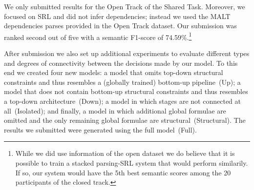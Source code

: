 We only submitted results for the Open Track of the Shared Task. Moreover, we focused on SRL and did not infer dependencies; instead we used the MALT dependencies parses provided in the Open Track dataset. Our submission was ranked second out of five with a semantic F1-score of 74.59\%.\footnote{While we did use information of the open dataset we do believe that it is possible to train a stacked parsing-SRL system that would perform similarily. If so, our system would have the 5th best semantic scores among the 20 participants of the closed track. }  

After submission we also set up additional experiments to evaluate different types and degrees of connectivity between the decisions made by our model. To this end we created four new models: a model that omits top-down structural constraints and thus resembles a (globally trained) bottom-up pipeline~(Up); a model that does not contain bottom-up structural constraints and thus resembles a top-down architecture~(Down); a model in which stages are not connected at all~(Isolated); and finally, a model in which additional global formulae are omitted and the only remaining global formulae are structural~(Structural). The results we submitted were generated using the full model~(Full).



